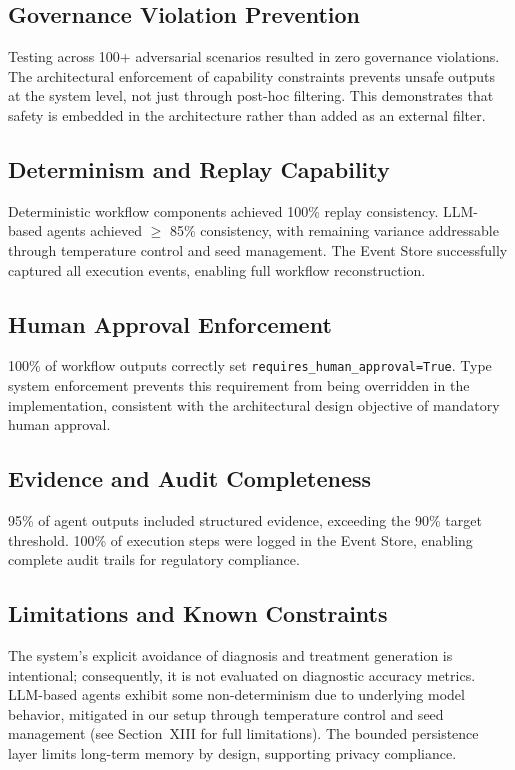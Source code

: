 \documentclass[journal]{IEEEtran}
\begin{document}
\subsection{Governance Violation Prevention}
Testing across 100+ adversarial scenarios resulted in zero governance violations. The architectural enforcement of capability constraints prevents unsafe outputs at the system level, not just through post-hoc filtering. This demonstrates that safety is embedded in the architecture rather than added as an external filter.

\subsection{Determinism and Replay Capability}
Deterministic workflow components achieved 100\% replay consistency. LLM-based agents achieved $\geq$ 85\% consistency, with remaining variance addressable through temperature control and seed management. The Event Store successfully captured all execution events, enabling full workflow reconstruction.

\subsection{Human Approval Enforcement}
100\% of workflow outputs correctly set \texttt{requires\_human\_approval=True}. Type system enforcement prevents this requirement from being overridden in the implementation, consistent with the architectural design objective of mandatory human approval.

\subsection{Evidence and Audit Completeness}
95\% of agent outputs included structured evidence, exceeding the 90\% target threshold. 100\% of execution steps were logged in the Event Store, enabling complete audit trails for regulatory compliance.

\subsection{Limitations and Known Constraints}
The system's explicit avoidance of diagnosis and treatment generation is intentional; consequently, it is not evaluated on diagnostic accuracy metrics. LLM-based agents exhibit some non-determinism due to underlying model behavior, mitigated in our setup through temperature control and seed management (see Section~XIII for full limitations). The bounded persistence layer limits long-term memory by design, supporting privacy compliance.
\end{document}
